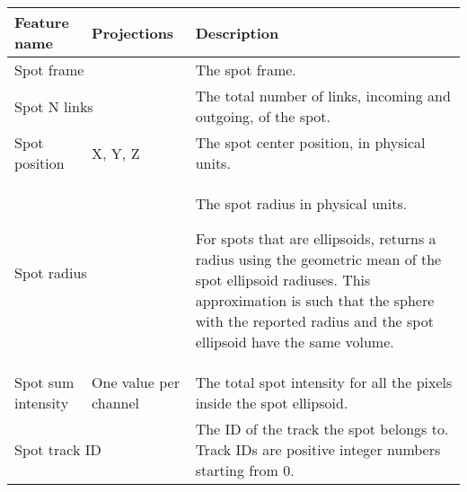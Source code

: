 {
\footnotesize

\begin{tabular}{p{}|p{}|p{}}

    \toprule
    \textbf{Feature name} &
    \textbf{Projections} &
    \textbf{Description}             
    \\ \midrule
    
    \multicolumn{2}{l|}{Spot frame} & 
    The spot frame.
    \\ \midrule

    \multicolumn{2}{l|}{Spot N links} & 
    The total number of links, incoming and outgoing, of the spot.
    \\ \midrule
    
    Spot position &
    X, Y, Z &
    The spot center position, in physical units.
    \\ \midrule
    
    \multicolumn{2}{l|}{Spot radius} & 
    The spot radius in physical units. 
    
    For spots that are ellipsoids, returns a radius using the geometric mean of the spot ellipsoid radiuses. This approximation is such that the sphere with the reported radius and the spot ellipsoid have the same volume.
    \\ \midrule
    
    Spot sum intensity & 
    One value per channel &
    The total spot intensity for all the pixels inside the spot ellipsoid.
    \\ \midrule
    
    \multicolumn{2}{l|}{Spot track ID} &
    The ID of the track the spot belongs to.
    Track IDs are positive integer numbers starting from 0.
    \\ \bottomrule

\end{tabular}
}